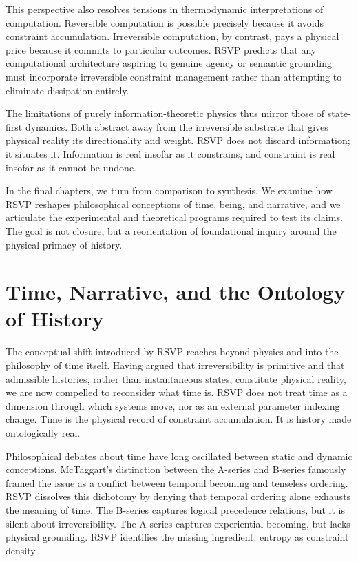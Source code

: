 \documentclass[11pt,oneside]{book}
\begin{document}
This perspective also resolves tensions in thermodynamic interpretations of computation. Reversible computation is possible precisely because it avoids constraint accumulation. Irreversible computation, by contrast, pays a physical price because it commits to particular outcomes. RSVP predicts that any computational architecture aspiring to genuine agency or semantic grounding must incorporate irreversible constraint management rather than attempting to eliminate dissipation entirely.

The limitations of purely information-theoretic physics thus mirror those of state-first dynamics. Both abstract away from the irreversible substrate that gives physical reality its directionality and weight. RSVP does not discard information; it situates it. Information is real insofar as it constrains, and constraint is real insofar as it cannot be undone.

In the final chapters, we turn from comparison to synthesis. We examine how RSVP reshapes philosophical conceptions of time, being, and narrative, and we articulate the experimental and theoretical programs required to test its claims. The goal is not closure, but a reorientation of foundational inquiry around the physical primacy of history.

\chapter{Time, Narrative, and the Ontology of History}

The conceptual shift introduced by RSVP reaches beyond physics and into the philosophy of time itself. Having argued that irreversibility is primitive and that admissible histories, rather than instantaneous states, constitute physical reality, we are now compelled to reconsider what time is. RSVP does not treat time as a dimension through which systems move, nor as an external parameter indexing change. Time is the physical record of constraint accumulation. It is history made ontologically real.

Philosophical debates about time have long oscillated between static and dynamic conceptions. McTaggart’s distinction between the A-series and B-series famously framed the issue as a conflict between temporal becoming and tenseless ordering. RSVP dissolves this dichotomy by denying that temporal ordering alone exhausts the meaning of time. The B-series captures logical precedence relations, but it is silent about irreversibility. The A-series captures experiential becoming, but lacks physical grounding. RSVP identifies the missing ingredient: entropy as constraint density.
\end{document}
